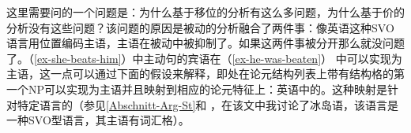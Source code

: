 
这里需要问的一个问题是：为什么基于移位的分析有这么多问题，为什么基于价的分析没有这些问题？该问题的原因是被动的分析融合了两件事：像英语这种SVO语言用位置编码主语，主语在被动中被抑制了。如果这两件事被分开那么就没问题了。（\ref{ex-she-beats-him}）中主动句的宾语在（\ref{ex-he-was-beaten}） 中可以实现为主语，这一点可以通过下面的假设来解释，即处在论元结构列表上带有结构格的第一个NP可以实现为主语并且映射到相应的论元特征上：英语中的\sprc。这种映射是针对特定语言的（参见\ref{Abschnitt-Arg-St}和 ，在该文中我讨论了冰岛语，该语言是一种SVO型语言，其主语有词汇格）。

